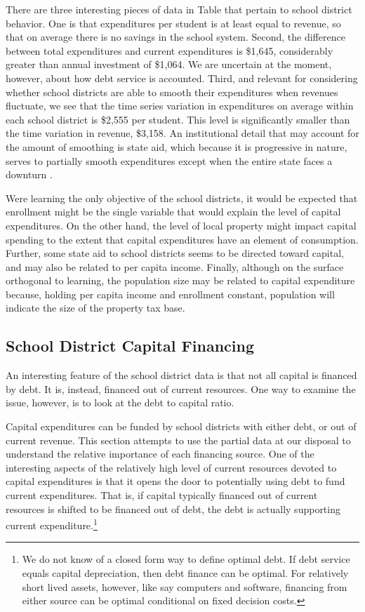 There are three interesting pieces of data in Table that pertain to school district behavior. One is that expenditures per student is at least equal to revenue, so that on average there is no savings in the school system. Second, the difference between total expenditures and current expenditures is \$1,645, considerably greater than annual investment of \$1,064. We are uncertain at the moment, however, about how debt service is accounted. Third, and relevant for considering whether school districts are able to smooth their expenditures when revenues fluctuate, we see that the time series variation in expenditures on average within each school district is \$2,555 per student. This level is significantly smaller than the time variation in revenue, \$3,158. An institutional detail that may account for the amount of smoothing is state aid, which because it is progressive in nature, serves to partially smooth expenditures except when the entire state faces a downturn \autocite{biolsi_inequality_2022}.

Were learning the only objective of the school districts, it would be expected that enrollment might be the single variable that would explain the level of capital expenditures. On the other hand, the level of local property might impact capital spending to the extent that capital expenditures have an element of consumption. Further, some state aid to school districts seems to be directed toward capital, and may also be related to per capita income. Finally, although on the surface orthogonal to learning, the population size may be related to capital expenditure because, holding per capita income and enrollment constant, population will indicate the size of the property tax base.

\subsection{School District Capital Financing}

An interesting feature of the school district data is that not all capital is financed by debt. It is, instead, financed out of current resources. One way to examine the issue, however, is to look at the debt to capital ratio. 

Capital expenditures can be funded by school districts with either debt, or out of current revenue.  This section attempts to use the partial data at our disposal to understand the relative importance of each financing source.  One of the interesting aspects of the relatively high level of current resources devoted to capital expenditures is that it opens the door to potentially using debt to fund current expenditures.  That is, if capital typically financed out of current resources is shifted to be financed out of debt, the debt is actually supporting current expenditure.\footnote{We do not know of a closed form way to define optimal debt.  If debt service equals capital depreciation, then debt finance can be optimal.  For relatively short lived assets, however, like say computers and software, financing from either source can be optimal conditional on fixed decision costs.}

